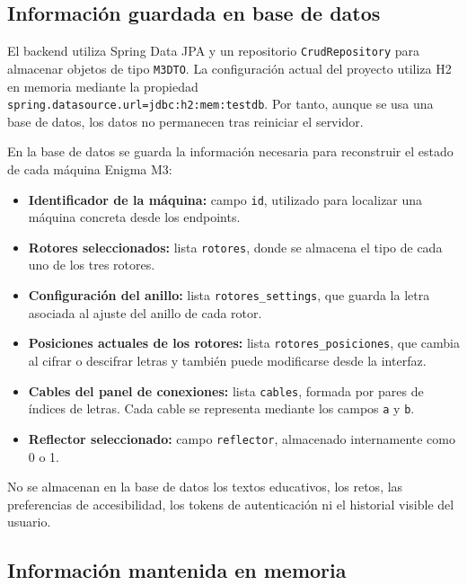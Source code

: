 \subsection{Información guardada en base de datos}

El backend utiliza Spring Data JPA y un repositorio \texttt{CrudRepository} para almacenar objetos de tipo \texttt{M3DTO}. La configuración actual del proyecto utiliza H2 en memoria mediante la propiedad \texttt{spring.datasource.url=jdbc:h2:mem:testdb}. Por tanto, aunque se usa una base de datos, los datos no permanecen tras reiniciar el servidor.

En la base de datos se guarda la información necesaria para reconstruir el estado de cada máquina Enigma M3:

\begin{itemize}
    \item \textbf{Identificador de la máquina:} campo \texttt{id}, utilizado para localizar una máquina concreta desde los endpoints.

    \item \textbf{Rotores seleccionados:} lista \texttt{rotores}, donde se almacena el tipo de cada uno de los tres rotores.

    \item \textbf{Configuración del anillo:} lista \texttt{rotores\_settings}, que guarda la letra asociada al ajuste del anillo de cada rotor.

    \item \textbf{Posiciones actuales de los rotores:} lista \texttt{rotores\_posiciones}, que cambia al cifrar o descifrar letras y también puede modificarse desde la interfaz.

    \item \textbf{Cables del panel de conexiones:} lista \texttt{cables}, formada por pares de índices de letras. Cada cable se representa mediante los campos \texttt{a} y \texttt{b}.

    \item \textbf{Reflector seleccionado:} campo \texttt{reflector}, almacenado internamente como 0 o 1.
\end{itemize}

No se almacenan en la base de datos los textos educativos, los retos, las preferencias de accesibilidad, los tokens de autenticación ni el historial visible del usuario.

\subsection{Información mantenida en memoria}

